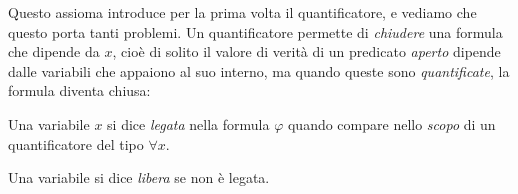 \documentclass[11pt]{scrartcl}
\begin{document}
	Questo assioma introduce per la prima volta il quantificatore, e vediamo che questo porta tanti problemi. Un quantificatore permette di \textit{chiudere} una formula che dipende da $x$, cioè di solito il valore di verità di un predicato \textit{aperto} dipende dalle variabili che appaiono al suo interno, ma quando queste sono \textit{quantificate}, la formula diventa chiusa:
	\begin{definition}
		Una variabile $x$ si dice \textit{legata} nella formula $\varphi$ quando compare nello \textit{scopo} di un quantificatore del tipo $\forall x$.
	\end{definition}
	\begin{definition}
		Una variabile si dice \textit{libera} se non è legata.
	\end{definition}
	
\end{document}
